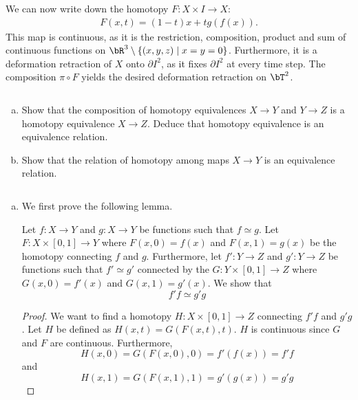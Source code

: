 \begin{homework}[e]
\begin{prf}
		We can now write down the homotopy $F:X \times I \to X$:
		\begin{align*}
			F(x,t) = (1 - t)x + tg(f(x)).
		\end{align*}
		This map is continuous, as it is the restriction, composition, product and sum of continuous functions on $\bR^3 \setminus \{(x,y,z) \mid x = y = 0\}$. Furthermore, it is a deformation retraction of $X$ onto $\partial I^2$, as it fixes $\partial I^2$ at every time step. The composition $\pi \circ F$ yields the desired deformation retraction on $\bT^2$.
	\end{prf}
	\newpage
	 $ $
	\begin{enumerate}[(a)]
		\item Show that the composition of homotopy equivalences $X\to Y$ and $Y\to Z$ is a homotopy equivalence $X\to Z$. Deduce that homotopy equivalence is an equivalence relation.
		\item Show that the relation of homotopy among maps $X \to Y$ is an equivalence relation.
	\end{enumerate}
	\begin{prf}$ $
		\begin{enumerate}[(a)]
			\item We first prove the following lemma. 
			
			\smallskip
			
			\begin{lem}
				Let $f:X \rightarrow Y$ and $g:X \rightarrow Y$ be functions such that $f \simeq g$. Let $F: X \times [0,1] \rightarrow Y$ where $F(x,0) = f(x)$ and $F(x,1) = g(x)$ be the homotopy connecting $f$ and $g$. Furthermore, let $f':Y \rightarrow Z$ and $g':Y \rightarrow Z$ be functions such that $f' \simeq g'$ connected by the $G:Y  \times [0,1] \rightarrow Z$ where $G(x,0) = f'(x)$ and $G(x,1) = g'(x)$. We show that 
				\begin{equation*}
					f' f \simeq g' g
				\end{equation*}
			\end{lem}
			
			\begin{proof}
				We want to find a homotopy $H: X \times [0,1] \rightarrow Z$ connecting $f'f$ and $g'g$. Let $H$ be defined as $H(x,t) = G(F(x,t),t)$. $H$ is continuous since $G$ and $F$ are continuous. Furthermore,
				\begin{equation*}
					H(x,0) = G(F(x,0),0) = f'(f(x)) = f'f
				\end{equation*}
				and 
				\begin{equation*}
					H(x,1) = G(F(x,1),1) = g'(g(x)) = g'g
				\end{equation*}
			\end{proof}
			

\end{enumerate}
\end{prf}
\end{homework}
